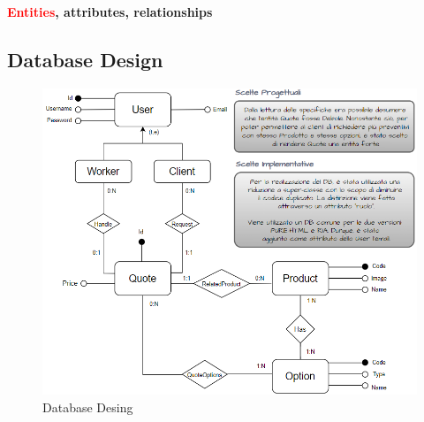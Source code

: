 \documentclass[a4paper, 12pt]{article}
\begin{document}
\noindent \textbf{\textcolor{red}{Entities}, \textcolor{myGreen}{attributes}, \textcolor{myBlue}{relationships}}
\newpage
\subsection{Database Design} \label{sub:databaseDesign}
\begin{figure}[h!]
	\centering
	\includegraphics[width=1\textwidth]{PureHTML_images/quotemanagementdesign1.png}
	\caption{Database Desing}
	\label{figure:database_design}
\end{figure}
\end{document}
